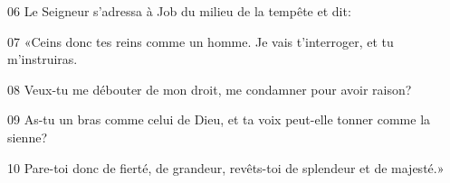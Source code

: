 06 Le Seigneur s’adressa à Job du milieu de la tempête et dit:

07 «Ceins donc tes reins comme un homme. Je vais t’interroger, et tu m’instruiras.

08 Veux-tu me débouter de mon droit, me condamner pour avoir raison?

09 As-tu un bras comme celui de Dieu, et ta voix peut-elle tonner comme la sienne?

10 Pare-toi donc de fierté, de grandeur, revêts-toi de splendeur et de majesté.»

